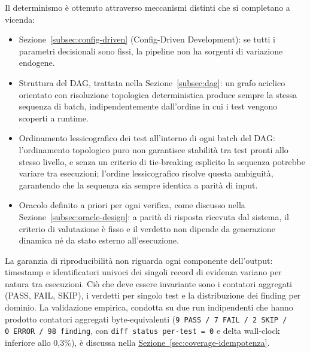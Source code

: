 Il determinismo è ottenuto attraverso meccanismi distinti che si completano a vicenda:

\begin{itemize}
      \item Sezione~\ref{subsec:config-driven} (Config-Driven Development): se tutti i parametri decisionali sono fissi, la pipeline non ha sorgenti di variazione endogene.
      \item Struttura del \gls{DAG}, trattata nella Sezione~\ref{subsec:dag}: un grafo aciclico orientato con risoluzione topologica deterministica produce sempre la stessa sequenza di batch, indipendentemente dall'ordine in cui i test vengono scoperti a runtime.
      \item Ordinamento lessicografico dei test all'interno di ogni batch del \gls{DAG}: l'ordinamento topologico puro non garantisce stabilità tra test pronti allo stesso livello, e senza un criterio di tie-breaking esplicito la sequenza potrebbe variare tra esecuzioni; l'ordine lessicografico risolve questa ambiguità, garantendo che la sequenza sia sempre identica a parità di input.
      \item Oracolo definito a priori per ogni verifica, come discusso nella Sezione~\ref{subsec:oracle-design}: a parità di risposta ricevuta dal sistema, il criterio di valutazione è fisso e il verdetto non dipende da generazione dinamica né da stato esterno all'esecuzione.
\end{itemize}

La garanzia di riproducibilità non riguarda ogni componente dell'output: timestamp e identificatori univoci dei singoli record di evidenza variano per natura tra esecuzioni. Ciò che deve essere invariante sono i contatori aggregati (PASS, FAIL, SKIP), i verdetti per singolo test e la distribuzione dei finding per dominio. La validazione empirica, condotta su due run indipendenti che hanno prodotto contatori aggregati byte-equivalenti (\texttt{9~PASS\,/\,7~FAIL\,/\,2~SKIP\,/\,0~ERROR\,/\,98~finding}, con \texttt{diff status per-test = 0} e delta wall-clock inferiore allo 0,3\%), è discussa nella \hyperref[sec:coverage-idempotenza]{Sezione~\ref*{sec:coverage-idempotenza}}.

















